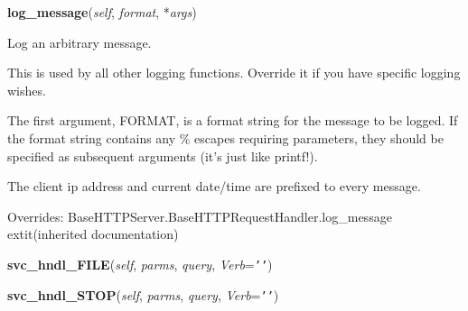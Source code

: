     \vspace{0.5ex}

\hspace{.8\funcindent}\begin{boxedminipage}{\funcwidth}

    \raggedright \textbf{log\_message}(\textit{self}, \textit{format}, *\textit{args})

\setlength{\parskip}{2ex}
    Log an arbitrary message.

    This is used by all other logging functions.  Override it if you have 
    specific logging wishes.

    The first argument, FORMAT, is a format string for the message to be 
    logged.  If the format string contains any \% escapes requiring 
    parameters, they should be specified as subsequent arguments (it's just
    like printf!).

    The client ip address and current date/time are prefixed to every 
    message.

\setlength{\parskip}{1ex}
      Overrides: BaseHTTPServer.BaseHTTPRequestHandler.log\_message 	extit{(inherited documentation)}

    \end{boxedminipage}

    \label{Proxy:Proxy:svc_hndl_FILE}

    \vspace{0.5ex}

\hspace{.8\funcindent}\begin{boxedminipage}{\funcwidth}

    \raggedright \textbf{svc\_hndl\_FILE}(\textit{self}, \textit{parms}, \textit{query}, \textit{Verb}={\tt \texttt{'}\texttt{}\texttt{'}})

\setlength{\parskip}{2ex}
\setlength{\parskip}{1ex}
    \end{boxedminipage}

    \label{Proxy:Proxy:svc_hndl_STOP}

    \vspace{0.5ex}

\hspace{.8\funcindent}\begin{boxedminipage}{\funcwidth}

    \raggedright \textbf{svc\_hndl\_STOP}(\textit{self}, \textit{parms}, \textit{query}, \textit{Verb}={\tt \texttt{'}\texttt{}\texttt{'}})

\setlength{\parskip}{2ex}
\setlength{\parskip}{1ex}
    \end{boxedminipage}

